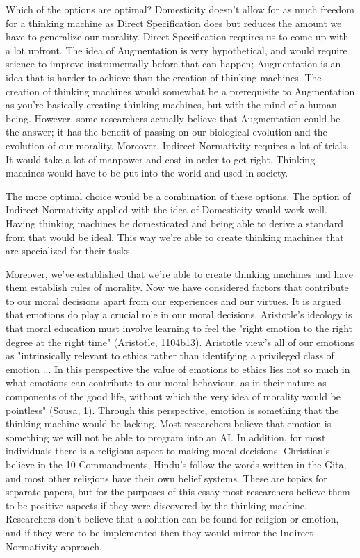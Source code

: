 \documentclass[11pt, oneside]{article}
\begin{document}
\par Which of the options are optimal? Domesticity doesn't allow for as much freedom for a thinking machine as Direct Specification does but reduces the amount we have to generalize our morality. Direct Specification requires us to come up with a lot upfront.
The idea of Augmentation is very hypothetical, and would require science to improve instrumentally before that can happen; Augmentation is an idea that is harder to achieve than the creation of thinking machines. The creation of thinking machines would somewhat be a prerequisite to Augmentation as you're basically creating thinking machines, but with the mind of a human being. However, some researchers actually believe that Augmentation could be the answer; it has the benefit of passing on our biological evolution and the evolution of our morality. Moreover, Indirect Normativity requires a lot of trials. It would take a lot of manpower and cost in order to get right. Thinking machines would have to be put into the world and used in society.
 
\par The more optimal choice would be a combination of these options. The option of Indirect Normativity applied with the idea of Domesticity would work well. Having thinking machines be domesticated and being able to derive a standard from that would be ideal. This way we're able to create thinking machines that are specialized for their tasks.
 
\par Moreover, we've established that we're able to create thinking machines and have them establish rules of morality. Now we have considered factors that contribute to our moral decisions apart from our experiences and our virtues. It is argued that emotions do play a crucial role in our moral decisions. Aristotle's ideology is that moral education must involve learning to feel the "right emotion to the right degree at the right time" (Aristotle, 1104b13). Aristotle view's all of our emotions as "intrinsically relevant to ethics rather than identifying a privileged class of emotion ... In this perspective the value of emotions to ethics lies not so much in what emotions can contribute to our moral behaviour, as in their nature as components of the good life, without which the very idea of morality would be pointless" (Sousa, 1). Through this perspective, emotion is something that the thinking machine would be lacking. Most researchers believe that emotion is something we will not be able to program into an AI. In addition, for most individuals there is a religious aspect to making moral decisions. Christian's believe in the 10 Commandments, Hindu's follow the words written in the Gita, and most other religions have their own belief systems. These are topics for separate papers, but for the purposes of this essay most researchers believe them to be positive aspects if they were discovered by the thinking machine. Researchers don't believe that a solution can be found for religion or emotion, and if they were to be implemented then they would mirror the Indirect Normativity approach.
 
\end{document}

